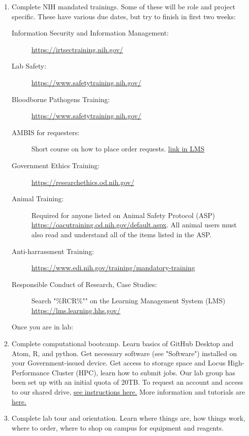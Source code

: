 \documentclass[10pt, letterpaper, twocolumn]{article} %
\begin{document}
\begin{enumerate}
\item Complete NIH mandated trainings. Some of these will be role and project specific.
These have various due dates, but try to finish in first two weeks:
\begin{description}
\item[Information Security and Information Management:]\href{https://irtsectraining.nih.gov/}{https://irtsectraining.nih.gov/}
\item[Lab Safety:]\href{https://www.safetytraining.nih.gov/}{https://www.safetytraining.nih.gov/}
\item[Bloodborne Pathogens Training:]\href{https://www.safetytraining.nih.gov/}{https://www.safetytraining.nih.gov/}
\item[AMBIS for requesters:] Short course on how to place order requests. \href{https://lms.learning.hhs.gov/Saba/Web_wdk/Main/learning/learningOfferingDetails.rdf}{link in LMS}
\item[Government Ethics Training:]\href{https://researchethics.od.nih.gov/}{https://researchethics.od.nih.gov/}
\item[Animal Training:]Required for anyone listed on Animal Safety Protocol (ASP) \href{https://oacutraining.od.nih.gov/default.aspx}{https://oacutraining.od.nih.gov/default.aspx}. All animal users must also read and understand all of the items listed in the ASP.
\item[Anti-harrassment Training:]\href{https://www.edi.nih.gov/training/mandatory-training}{https://www.edi.nih.gov/training/mandatory-training}
\item[Responsible Conduct of Research, Case Studies:] Search  "\%RCR\%"" on the Learning Management System (LMS) \href{https://lms.learning.hhs.gov/}{https://lms.learning.hhs.gov/}
\end{description}

Once you are in lab:
\item Complete computational bootcamp. Learn basics of GitHub Desktop and Atom, R, and python. Get necessary software (see "Software") installed on your Government-issued device. Get access to storage space and Locus High-Performance Cluster (HPC), learn how to submit jobs. Our lab group has been set up with an initial quota of 20TB. To request an account and access to our shared drive, \href{https://locus.niaid.nih.gov/userportal/documentation.php#Getting-Started/Request-an-Account}{see instructions here.} More information and tutorials are \href{https://locus.niaid.nih.gov}{here.}
\item Complete lab tour and orientation.	Learn where things are, how things work, where to order, where to shop on campus for equipment and reagents.
\end{enumerate}
\end{document}
